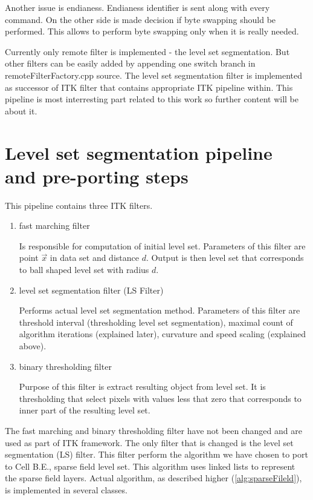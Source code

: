 Another issue is endianess.
Endianess identifier is sent along with every command. On the other side is made decision if byte swapping should be performed.
This allows to perform byte swapping only when it is really needed.

Currently only remote filter is implemented - the level set segmentation.
But other filters can be easily added by appending one switch branch in remoteFilterFactory.cpp source.
The level set segmentation filter is implemented as successor of ITK filter that contains appropriate ITK pipeline within.
This pipeline is most interresting part related to this work so further content will be about it.

\section{Level set segmentation pipeline and pre-porting steps}

This pipeline contains three ITK filters.
\begin{enumerate}
  \item{fast marching filter}
  \par
  Is responsible for computation of initial level set.
Parameters of this filter are point $\vec{x}$ in data set and distance $d$.
Output is then level set that corresponds to ball shaped level set with radius $d$.

  \item{level set segmentation filter (LS Filter)}
  \par
  Performs actual level set segmentation method.
Parameters of this filter are threshold interval (thresholding level set segmentation),  maximal count of algorithm iterations (explained later), curvature and speed scaling (explained above).

  \item{binary thresholding filter}
  \par
  Purpose of this filter is extract resulting object from level set.
It is thresholding that select pixels with values less that zero that corresponds to inner part of the resulting level set.
\end{enumerate}

The fast marching and binary thresholding filter have not been changed and are used as part of ITK framework.
The only filter that is changed is the level set segmentation (LS) filter.
This filter perform the algorithm we have chosen to port to Cell B.E., sparse field level set.
This algorithm uses linked lists to represent the sparse field layers.
Actual algorithm, as described higher (\ref{alg:sparseFileld}), is implemented in several classes.

